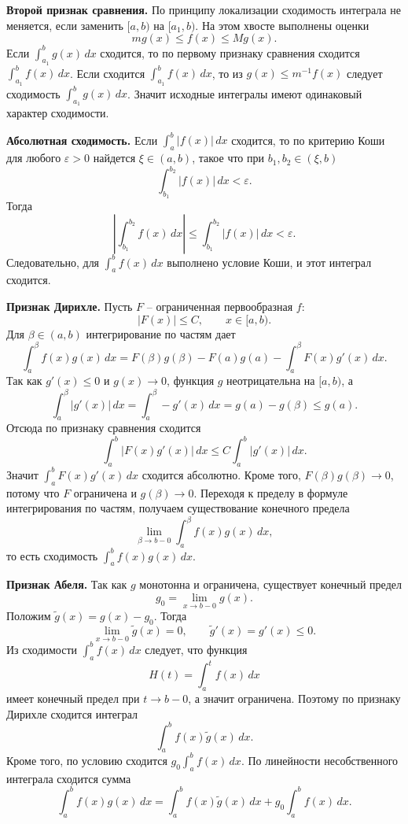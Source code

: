 \documentclass[12pt,a4paper]{article}
\newcommand{\eps}{\varepsilon}
\newcommand{\dd}{\,d}
\begin{document}
\textbf{Второй признак сравнения.}
По принципу локализации сходимость интеграла не меняется, если заменить
\([a,b)\) на \([a_1,b)\). На этом хвосте выполнены оценки
\[
  m g(x)\le f(x)\le M g(x).
\]
Если \(\int_{a_1}^b g(x)\dd x\) сходится, то по первому признаку сравнения
сходится \(\int_{a_1}^b f(x)\dd x\). Если сходится
\(\int_{a_1}^b f(x)\dd x\), то из \(g(x)\le m^{-1}f(x)\) следует сходимость
\(\int_{a_1}^b g(x)\dd x\). Значит исходные интегралы имеют одинаковый
характер сходимости.

\textbf{Абсолютная сходимость.}
Если \(\int_a^b |f(x)|\dd x\) сходится, то по критерию Коши для любого
\(\eps>0\) найдется \(\xi\in(a,b)\), такое что при
\(b_1,b_2\in(\xi,b)\)
\[
  \int_{b_1}^{b_2}|f(x)|\dd x<\eps .
\]
Тогда
\[
  \left|\int_{b_1}^{b_2}f(x)\dd x\right|
  \le
  \int_{b_1}^{b_2}|f(x)|\dd x<\eps .
\]
Следовательно, для \(\int_a^b f(x)\dd x\) выполнено условие Коши, и этот
интеграл сходится.

\textbf{Признак Дирихле.}
Пусть \(F\) -- ограниченная первообразная \(f\):
\[
  |F(x)|\le C,\qquad x\in[a,b).
\]
Для \(\beta\in(a,b)\) интегрирование по частям дает
\[
  \int_a^\beta f(x)g(x)\dd x
  =
  F(\beta)g(\beta)-F(a)g(a)
  -
  \int_a^\beta F(x)g'(x)\dd x.
\]
Так как \(g'(x)\le0\) и \(g(x)\to0\), функция \(g\) неотрицательна на
\([a,b)\), а
\[
  \int_a^\beta |g'(x)|\dd x
  =
  \int_a^\beta -g'(x)\dd x
  =
  g(a)-g(\beta)\le g(a).
\]
Отсюда по признаку сравнения сходится
\[
  \int_a^b |F(x)g'(x)|\dd x
  \le
  C\int_a^b |g'(x)|\dd x.
\]
Значит \(\int_a^b F(x)g'(x)\dd x\) сходится абсолютно. Кроме того,
\(F(\beta)g(\beta)\to0\), потому что \(F\) ограничена и \(g(\beta)\to0\).
Переходя к пределу в формуле интегрирования по частям, получаем существование
конечного предела
\[
  \lim_{\beta\to b-0}\int_a^\beta f(x)g(x)\dd x,
\]
то есть сходимость \(\int_a^b f(x)g(x)\dd x\).

\textbf{Признак Абеля.}
Так как \(g\) монотонна и ограничена, существует конечный предел
\[
  g_0=\lim_{x\to b-0}g(x).
\]
Положим \(\widetilde g(x)=g(x)-g_0\). Тогда
\[
  \lim_{x\to b-0}\widetilde g(x)=0,\qquad
  \widetilde g'(x)=g'(x)\le0.
\]
Из сходимости \(\int_a^b f(x)\dd x\) следует, что функция
\[
  H(t)=\int_a^t f(x)\dd x
\]
имеет конечный предел при \(t\to b-0\), а значит ограничена. Поэтому по
признаку Дирихле сходится интеграл
\[
  \int_a^b f(x)\widetilde g(x)\dd x.
\]
Кроме того, по условию сходится \(g_0\int_a^b f(x)\dd x\). По линейности
несобственного интеграла сходится сумма
\[
  \int_a^b f(x)g(x)\dd x
  =
  \int_a^b f(x)\widetilde g(x)\dd x
  +
  g_0\int_a^b f(x)\dd x.
\]
\end{document}

